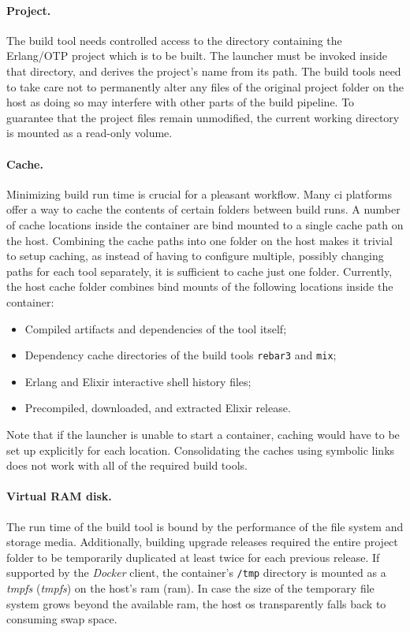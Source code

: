 \paragraph{Project.} The build tool needs controlled access to the directory containing the Erlang/OTP project which is to be built. The launcher must be invoked inside that directory, and derives the project's name from its path. The build tools need to take care not to permanently alter any files of the original project folder on the host as doing so may interfere with other parts of the build pipeline. To guarantee that the project files remain unmodified, the current working directory is mounted as a read-only volume.

\paragraph{Cache.} Minimizing build run time is crucial for a pleasant workflow. Many \acrshort{ci} platforms offer a way to cache the contents of certain folders between build runs. A number of cache locations inside the container are bind mounted to a single cache path on the host. Combining the cache paths into one folder on the host makes it trivial to setup caching, as instead of having to configure multiple, possibly changing paths for each tool separately, it is sufficient to cache just one folder. Currently, the host cache folder combines bind mounts of the following locations inside the container:
\begin{itemize}
  \item Compiled artifacts and dependencies of the tool itself;
  \item Dependency cache directories of the build tools \lstinline|rebar3| and \lstinline|mix|;
  \item Erlang and Elixir interactive shell history files;
  \item Precompiled, downloaded, and extracted Elixir release.
\end{itemize}
Note that if the launcher is unable to start a container, caching would have to be set up explicitly for each location. Consolidating the caches using symbolic links does not work with all of the required build tools.

\paragraph{Virtual RAM disk.} The run time of the build tool is bound by the performance of the file system and storage media. Additionally, building upgrade releases required the entire project folder to be temporarily duplicated at least twice for each previous release.
If supported by the \emph{Docker} client, the container's \lstinline|/tmp| directory is mounted as a \emph{\acrlong{tmpfs}} (\emph{\acrshort{tmpfs}}) on the host's \acrlong{ram} (\acrshort{ram}). In case the size of the temporary file system grows beyond the available \acrshort{ram}, the host \acrshort{os} transparently falls back to consuming swap space.

